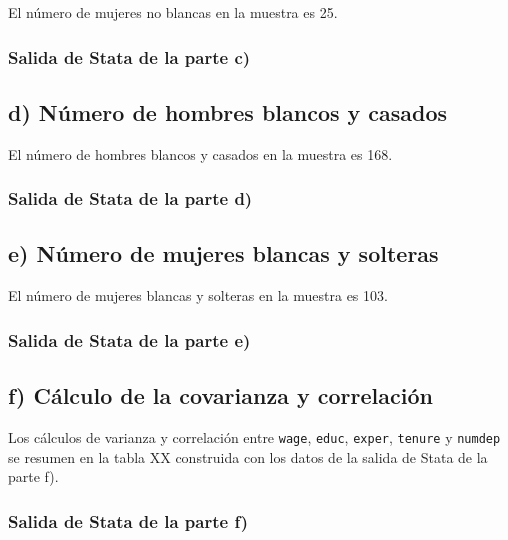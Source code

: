 \documentclass[12pt]{article}
\begin{document}
El número de mujeres no blancas en la muestra es 25.

\subsubsection*{Salida de Stata de la parte c)}

%

\subsection*{d) Número de hombres blancos y casados}

El número de hombres blancos y casados en la muestra es 168.

\subsubsection*{Salida de Stata de la parte d)}

%

\subsection*{e) Número de mujeres blancas y solteras}

El número de mujeres blancas y solteras en la muestra es 103.

\subsubsection*{Salida de Stata de la parte e)}

%

\subsection*{f) Cálculo de la covarianza y correlación}

Los cálculos de varianza y correlación entre \texttt{wage}, \texttt{educ}, \texttt{exper}, \texttt{tenure} y \texttt{numdep} se resumen en la tabla XX construida con los datos de la salida de Stata de la parte f). 

\subsubsection*{Salida de Stata de la parte f)}
\end{document}
